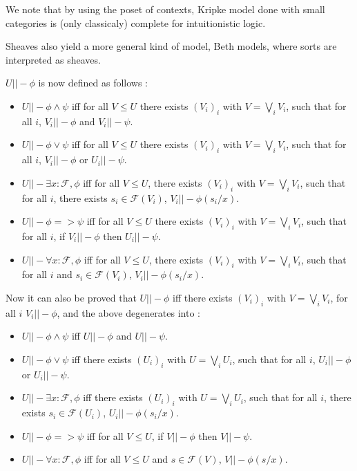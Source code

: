 \documentclass[11pt]{article}
\newcommand{\0}{\mathbf{0}}
\newcommand{\1}{\mathbf{1}}
\begin{document}
We note that by using the poset of contexts, Kripke model done with small categories is (only classicaly) complete for intuitionistic logic.

Sheaves also yield a more general kind of model, Beth models, where sorts are interpreted as sheaves.

$U ||- \phi$ is now defined as follows :
\begin{itemize}
    \item $U ||- \phi \wedge \psi$ iff for all $V \leq U$ there exists $(V_i)_i$ with $V = \bigvee_i V_i$, such that for all $i$, $V_i ||- \phi$ and $V_i ||- \psi $.
    \item $U ||- \phi \vee \psi $ iff for all $V \leq U$ there exists $(V_i)_i$ with $V = \bigvee_i V_i$, such that for all $i$, $V_i ||- \phi$ or $U_i ||- \psi $.
    \item $U ||- \exists x : \mathcal{F}, \phi $ iff for all $V\leq U$, there exists $(V_i)_i$ with $V = \bigvee_i V_i$, such that for all $i$, there exists $s_i\in \mathcal{F}(V_i)$, $V_i ||- \phi(s_i/x)$.
    \item $U ||- \phi => \psi $ iff for all $V \leq U$ there exists $(V_i)_i$ with $V = \bigvee_i V_i$, such that for all $i$, if $V_i ||- \phi$ then $U_i ||- \psi $.
    \item $U ||- \forall x : \mathcal{F}, \phi $ iff for all $V\leq U$, there exists $(V_i)_i$ with $V = \bigvee_i V_i$, such that for all $i$ and $s_i\in \mathcal{F}(V_i)$, $V_i ||- \phi(s_i/x)$.
\end{itemize}
Now it can also be proved that $U ||- \phi$ iff there exists $(V_i)_i$ with $V = \bigvee_i V_i$, for all $i$ $V_i||- \phi$, and the above degenerates into :
\begin{itemize}
    \item $U ||- \phi \wedge \psi$ iff $U ||- \phi$ and $U ||- \psi $.
    \item $U ||- \phi \vee \psi $ iff there exists $(U_i)_i$ with $U = \bigvee_i U_i$, such that for all $i$, $U_i ||- \phi$ or $U_i ||- \psi $.
    \item $U ||- \exists x : \mathcal{F}, \phi $ iff there exists $(U_i)_i$ with $U = \bigvee_i U_i$, such that for all $i$, there exists $s_i\in \mathcal{F}(U_i)$, $U_i ||- \phi(s_i/x)$.
    \item $U ||- \phi => \psi $ iff for all $V \leq U$, if $V ||- \phi$ then $V ||- \psi $.
    \item $U ||- \forall x : \mathcal{F}, \phi $ iff for all $V\leq U$ and $s\in \mathcal{F}(V)$, $V ||- \phi(s/x)$.
\end{itemize}
\end{document}
